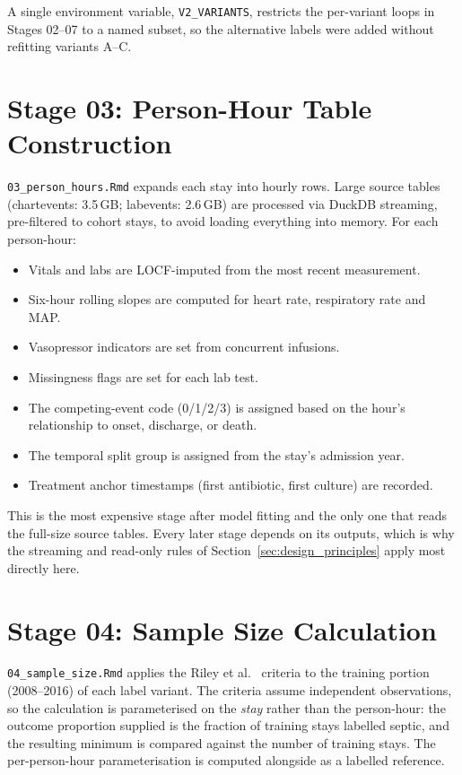 A single environment variable, \texttt{V2\_VARIANTS}, restricts the per-variant
loops in Stages 02--07 to a named subset, so the alternative labels were added
without refitting variants A--C.


\section{Stage 03: Person-Hour Table Construction}

\texttt{03\_person\_hours.Rmd} expands each stay into hourly rows. Large source
tables (chartevents: 3.5\,GB; labevents: 2.6\,GB) are processed via DuckDB
streaming, pre-filtered to cohort stays, to avoid loading everything into
memory. For each person-hour:

\begin{itemize}
    \item Vitals and labs are LOCF-imputed from the most recent measurement.
    \item Six-hour rolling slopes are computed for heart rate, respiratory
    rate and MAP.
    \item Vasopressor indicators are set from concurrent infusions.
    \item Missingness flags are set for each lab test.
    \item The competing-event code (0/1/2/3) is assigned based on the hour's
    relationship to onset, discharge, or death.
    \item The temporal split group is assigned from the stay's admission year.
    \item Treatment anchor timestamps (first antibiotic, first culture) are
    recorded.
\end{itemize}

This is the most expensive stage after model fitting and the only one that
reads the full-size source tables. Every later stage depends on its outputs,
which is why the streaming and read-only rules of
Section~\ref{sec:design_principles} apply most directly here.


\section{Stage 04: Sample Size Calculation}

\texttt{04\_sample\_size.Rmd} applies the Riley et al.\
\cite{riley2019sample} criteria to the training portion (2008--2016) of each
label variant. The criteria assume independent observations, so the calculation
is parameterised on the \emph{stay} rather than the person-hour: the outcome
proportion supplied is the fraction of training stays labelled septic, and the
resulting minimum is compared against the number of training stays. The
per-person-hour parameterisation is computed alongside as a labelled
reference.


